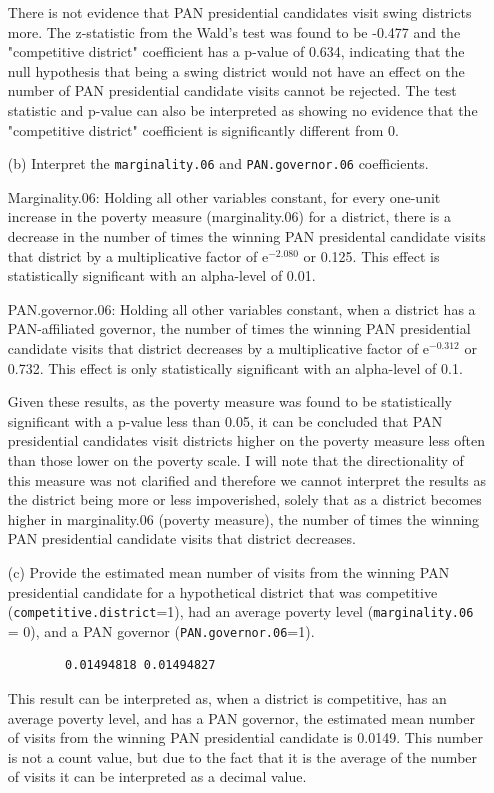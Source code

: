 \documentclass[12pt,letterpaper]{article}
\begin{document}
\begin{enumerate}
	\noindent There is not evidence that PAN presidential candidates visit swing districts more. The z-statistic from the Wald's test was found to be -0.477 and the "competitive district" coefficient has a p-value of 0.634, indicating that the null hypothesis that being a swing district would not have an effect on the number of PAN presidential candidate visits cannot be rejected. The test statistic and p-value can also be interpreted as showing no evidence that the "competitive district" coefficient is significantly different from 0. 
	
	\item [(b)]
	Interpret the \texttt{marginality.06} and \texttt{PAN.governor.06} coefficients.
	
	\noindent Marginality.06: Holding all other variables constant, for every one-unit increase in the poverty measure (marginality.06) for a district, there is a decrease in the number of times the winning PAN presidental candidate visits that district by a multiplicative factor of e$^{-2.080}$ or 0.125. This effect is statistically significant with an alpha-level of 0.01.
	
	\noindent PAN.governor.06: Holding all other variables constant, when a district has a PAN-affiliated governor, the number of times the winning PAN presidential candidate visits that district decreases by a multiplicative factor of e$^{-0.312}$ or 0.732. This effect is only statistically significant with an alpha-level of 0.1.
	
	\noindent Given these results, as the poverty measure was found to be statistically significant with a p-value less than 0.05, it can be concluded that PAN presidential candidates visit districts higher on the poverty measure less often than those lower on the poverty scale. I will note that the directionality of this measure was not clarified and therefore we cannot interpret the results as the district being more or less impoverished, solely that as a district becomes higher in marginality.06 (poverty measure), the number of times the winning PAN presidential candidate visits that district decreases.
	
	\item [(c)]
	Provide the estimated mean number of visits from the winning PAN presidential candidate for a hypothetical district that was competitive (\texttt{competitive.district}=1), had an average poverty level (\texttt{marginality.06} = 0), and a PAN governor (\texttt{PAN.governor.06}=1).
	
	
	
	\begin{verbatim}           
		0.01494818 0.01494827 
	\end{verbatim}
	
	\noindent This result can be interpreted as, when a district is competitive, has an average poverty level, and has a PAN governor, the estimated mean number of visits from the winning PAN presidential candidate is 0.0149. This number is not a count value, but due to the fact that it is the average of the number of visits it can be interpreted as a decimal value. 
	
\end{enumerate}
\end{document}
